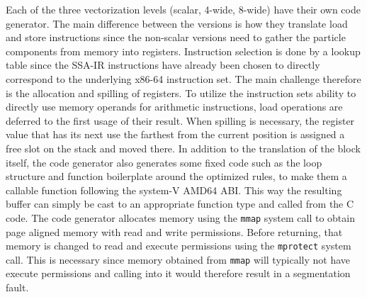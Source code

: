 Each of the three vectorization levels (scalar, 4-wide, 8-wide) have their own code generator. The main difference between the versions is how they translate load and store instructions since the non-scalar versions need to gather the particle components from memory into registers. Instruction selection is done by a lookup table since the SSA-IR instructions have already been chosen to directly correspond to the underlying x86-64 instruction set. The main challenge therefore is the allocation and spilling of registers. To utilize the instruction sets ability to directly use memory operands for arithmetic instructions, load operations are deferred to the first usage of their result. When spilling is necessary, the register value that has its next use the farthest from the current position is assigned a free slot on the stack and moved there. In addition to the translation of the block itself, the code generator also generates some fixed code such as the loop structure and function boilerplate around the optimized rules, to make them a callable function following the system-V AMD64 ABI. This way the resulting buffer can simply be cast to an appropriate function type and called from the C code. The code generator allocates memory using the \texttt{mmap} system call to obtain page aligned memory with read and write permissions. Before returning, that memory is changed to read and execute permissions using the \texttt{mprotect} system call. This is necessary since memory obtained from \texttt{mmap} will typically not have execute permissions and calling into it would therefore result in a segmentation fault.
